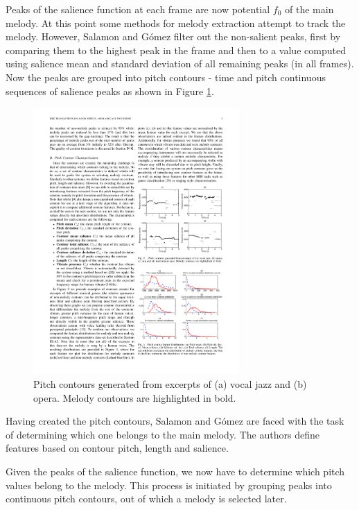 Peaks of the salience function at each frame are now potential $f_{0}$ of the main melody. At this point some methods for melody extraction attempt to track the melody. However, Salamon and G\'{o}mez filter out the non-salient peaks, first by comparing them to the highest peak in the frame and then to a value computed using salience mean and standard deviation of all remaining peaks (in all frames). Now the peaks are grouped into pitch contours - time and pitch continuous sequences of salience peaks as shown in Figure \ref{fig:pitchcontours}.


\begin{figure}[h!]
  \centering
    \includegraphics[width=0.7\textwidth]{Figures/pitchcontour}
      \caption{Pitch contours generated from excerpts of (a) vocal jazz and (b) opera. Melody contours are highlighted in bold\cite{salamon}.}
\label{fig:pitchcontours}
\end{figure}

Having created the pitch contours, Salamon and G\'{o}mez are faced with the task of determining which one belongs to the main melody. The authors define features based on contour pitch, length and salience.

Given the peaks of the salience function, we now have to determine which pitch values belong to the melody. This process is initiated by grouping peaks into continuous pitch contours, out of which a melody is selected later. 

